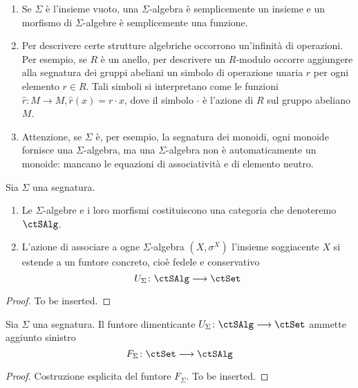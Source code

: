 \begin{examples}\label{esempi_sigma_alg}
\hfill
\begin{enumerate}
\item Se $\Sigma$ è l'insieme vuoto, una $\Sigma$-algebra è semplicemente un insieme e un morfismo di $\Sigma$-algebre è 
semplicemente una funzione.
\item Per descrivere certe strutture algebriche occorrono un'infinità di operazioni. Per esempio, se $R$ è un anello, per descrivere un 
$R$-modulo occorre aggiungere alla segnatura dei gruppi abeliani un simbolo di operazione unaria $\widehat{r}$ per ogni elemento $r \in R$.
Tali simboli si interpretano come le funzioni $\widehat{r} \colon M \to M, \widehat{r}(x) = r \cdot x$, dove il simbolo $\cdot$ è l'azione di $R$ 
sul gruppo abeliano $M$.
\item Attenzione, se $\Sigma$ è, per esempio, la segnatura dei monoidi, ogni monoide fornisce una $\Sigma$-algebra, ma una $\Sigma$-algebra 
non è automaticamente un monoide: mancano le equazioni di associatività e di elemento neutro.
\end{enumerate}
\end{examples} 

\begin{proposition}\label{prop_cat_sigma_alg}
Sia $\Sigma$ una segnatura.
\begin{enumerate}
\item Le $\Sigma$-algebre e i loro morfismi costituiscono una categoria che denoteremo $\ctSAlg$.
\item L'azione di associare a ogne $\Sigma$-algebra $(X,\sigma^X)$ l'insieme soggiacente $X$ si estende a un funtore concreto, cioè fedele e
conservativo
\[
  U_{\Sigma} \colon \ctSAlg \fun \ctSet 
\]
\end{enumerate}
\end{proposition}

\begin{proof}
To be inserted.
\end{proof} 

\begin{proposition}\label{prop_alg_libera}
Sia $\Sigma$ una segnatura. Il funtore dimenticante $U_{\Sigma} \colon \ctSAlg \fun \ctSet$ ammette aggiunto sinistro
\[
  F_{\Sigma} \colon \ctSet \fun \ctSAlg 
\]
\end{proposition} 

\begin{proof}
Costruzione esplicita del funtore $F_{\Sigma}$. To be inserted.
\end{proof}

